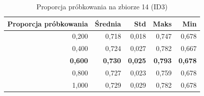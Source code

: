 \begin{table}[htbp]
\centering
\small
\setlength{\tabcolsep}{6pt}
\renewcommand{\arraystretch}{1.2}
\caption{Proporcja próbkowania na zbiorze 14 (ID3)}
\label{tab:ID3_sample_ratio_14}
\begin{tabular}{r|r|r|r|r}
\toprule
Proporcja próbkowania & Średnia & Std & Maks & Min \\
\hline
0,200 & 0,718 & 0,018 & 0,747 & 0,678 \\
0,400 & 0,724 & 0,027 & 0,782 & 0,667 \\
\textbf{0,600} & \textbf{0,730} & \textbf{0,025} & \textbf{0,793} & \textbf{0,678} \\
0,800 & 0,727 & 0,023 & 0,759 & 0,678 \\
1,000 & 0,729 & 0,029 & 0,782 & 0,678 \\
\bottomrule
\end{tabular}
\end{table}